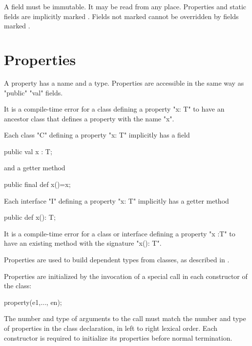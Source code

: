 A  field must be immutable. It may be read from any place.
Properties and static fields are implicitly marked .
Fields not marked  cannot be overridden by fields marked
.

\section{Properties}
\label{PropertiesInClasses}

A property has a name and a type.   Properties
are accessible in the same way as \xcd"public" \xcd"val"
fields.

\begin{staticrule*}
It is a compile-time error for a class
defining a property \xcd"x: T" to have an ancestor class that defines
a property with the name \xcd"x".  
\end{staticrule*}

Each class \xcd"C" defining a property \xcd"x: T" implicitly has a field

\begin{xten}
public val x : T;
\end{xten} 

\noindent and a getter method

\begin{xten}
public final def x()=x;
\end{xten}

\noindent Each interface \xcd"I" defining a property \xcd"x: T"
implicitly has a getter method

\begin{xten}
public def x(): T;
\end{xten}

\begin{staticrule*}
It is a compile-time error for a class or
interface defining a property \xcd"x :T" to have an existing method with
the signature \xcd"x(): T".
\end{staticrule*}

Properties are used to build dependent types from classes, as
described in .

Properties are initialized by the invocation of a special  call in each constructor
of the class:
\begin{xten}
property(e1,..., en);
\end{xten}
The number and type of arguments to the  call must match the number
and type of properties in the class declaration, in left to right lexical order. Each constructor is required to initialize its properties before normal termination.
\label{PropertyCall}

